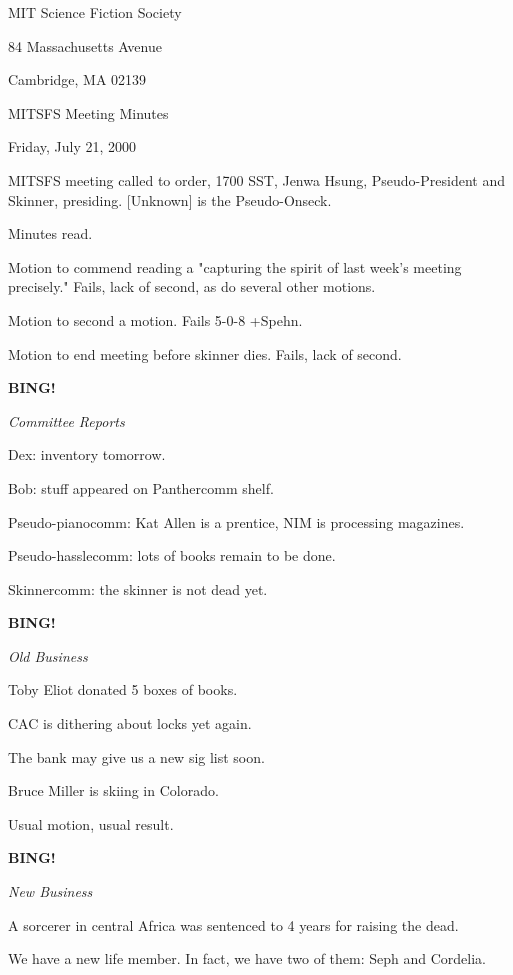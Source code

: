 \documentclass[12pt]{article}
\newcommand{\bing}{{\bf BING!} }
\newcommand{\goto}[1]{\bing \vskip 12pt \centerline{{\em{#1}}}}
\begin{document}
\begin{center}

MIT Science Fiction Society 

84 Massachusetts Avenue

Cambridge, MA 02139

\vspace{12pt}

MITSFS Meeting Minutes 

Friday, July 21, 2000

\end{center}
 
\vspace{18pt}

\setlength{\parskip}{6pt}

\noindent
MITSFS meeting called to order, 1700 SST, Jenwa Hsung, Pseudo-President and
Skinner, presiding.  [Unknown] is the Pseudo-Onseck.

Minutes read.

Motion to commend reading a "capturing the spirit of last week's meeting precisely." Fails, lack of second, as do several other motions.

Motion to second a motion. Fails 5-0-8 +Spehn.

Motion to end meeting before skinner dies. Fails, lack of second.

\goto{Committee Reports}

Dex: inventory tomorrow.

Bob: stuff appeared on Panthercomm shelf.

Pseudo-pianocomm: Kat Allen is a prentice, NIM is processing magazines.

Pseudo-hasslecomm: lots of books remain to be done.

Skinnercomm: the skinner is not dead yet.

\goto{Old Business}

Toby Eliot donated 5 boxes of books.

CAC is dithering about locks yet again.

The bank may give us a new sig list soon.

Bruce Miller is skiing in Colorado.

Usual motion, usual result.

\goto{New Business}

A sorcerer in central Africa was sentenced to 4 years for raising the dead.

We have a new life member. In fact, we have two of them: Seph and Cordelia.
\end{document}
